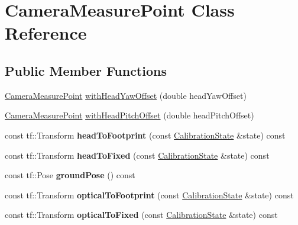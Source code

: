 \hypertarget{classCameraMeasurePoint}{\section{\-Camera\-Measure\-Point \-Class \-Reference}
\label{classCameraMeasurePoint}
}
\subsection*{\-Public \-Member \-Functions}
\begin{DoxyCompactItemize}
\item 
\hyperlink{classCameraMeasurePoint}{\-Camera\-Measure\-Point} \hyperlink{classCameraMeasurePoint_a86e386600a98acad86f70a5aa4d895ce}{with\-Head\-Yaw\-Offset} (double head\-Yaw\-Offset)
\item 
\hyperlink{classCameraMeasurePoint}{\-Camera\-Measure\-Point} \hyperlink{classCameraMeasurePoint_ab1ff9ca0a9fc47aa6e943e93b513eda7}{with\-Head\-Pitch\-Offset} (double head\-Pitch\-Offset)
\item 
\hypertarget{classCameraMeasurePoint_ad2b821cf3a179c25a039e5bf3e5696bc}{const tf\-::\-Transform {\bfseries head\-To\-Footprint} (const \hyperlink{classCalibrationState}{\-Calibration\-State} \&state) const }\label{classCameraMeasurePoint_ad2b821cf3a179c25a039e5bf3e5696bc}

\item 
\hypertarget{classCameraMeasurePoint_a7b82b2a1d296f878f27d9a459b7a158f}{const tf\-::\-Transform {\bfseries head\-To\-Fixed} (const \hyperlink{classCalibrationState}{\-Calibration\-State} \&state) const }\label{classCameraMeasurePoint_a7b82b2a1d296f878f27d9a459b7a158f}

\item 
\hypertarget{classCameraMeasurePoint_a0b34bfdb160f35fac423012e0dd5a7cd}{const tf\-::\-Pose {\bfseries ground\-Pose} () const }\label{classCameraMeasurePoint_a0b34bfdb160f35fac423012e0dd5a7cd}

\item 
\hypertarget{classCameraMeasurePoint_ab8444ead826ed2658d5ff18067ed27ad}{const tf\-::\-Transform {\bfseries optical\-To\-Footprint} (const \hyperlink{classCalibrationState}{\-Calibration\-State} \&state) const }\label{classCameraMeasurePoint_ab8444ead826ed2658d5ff18067ed27ad}

\item 
\hypertarget{classCameraMeasurePoint_a74a525a0c6bcb7f0ec8b67a758ded39b}{const tf\-::\-Transform {\bfseries optical\-To\-Fixed} (const \hyperlink{classCalibrationState}{\-Calibration\-State} \&state) const }\label{classCameraMeasurePoint_a74a525a0c6bcb7f0ec8b67a758ded39b}


\end{DoxyCompactItemize}
